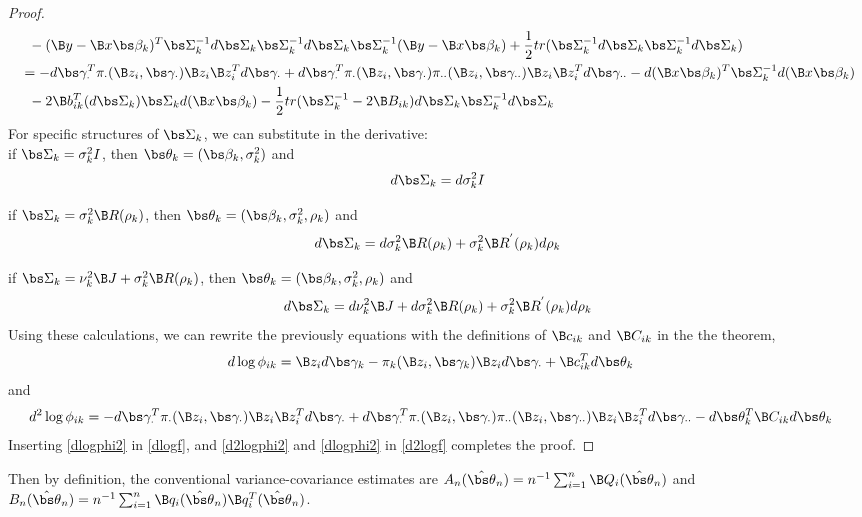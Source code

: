 \begin{proof}
\begin{align}
&\;\;-(\B y-\B x\bs \beta_{k})^{T}\bs\Sigma_{k}^{-1}d\bs\Sigma_{k}\bs\Sigma_{k}^{-1}d\bs\Sigma_{k}\bs\Sigma_{k}^{-1}(\B y-\B x\bs\beta_{k})+\frac{1}{2}tr(\bs\Sigma_{k}^{-1}d\bs\Sigma_{k}\bs\Sigma_{k}^{-1}d\bs\Sigma_{k})\nonumber\\
&=-d\bs\gamma_{\cdot}^{T}\pi_{\cdot}(\B z_{i},\bs\gamma_{\cdot})\B z_{i}\B z_{i}^{T}d\bs\gamma_{\cdot}+d\bs\gamma_{\cdot}^{T}\pi_{\cdot}(\B z_{i},\bs\gamma_{\cdot})\pi_{\cdot\cdot}(\B z_{i},\bs\gamma_{\cdot\cdot})\B z_{i}\B z_{i}^{T}d\bs\gamma_{\cdot\cdot}-d(\B x\bs \beta_{k})^{T}\bs\Sigma_{k}^{-1}d(\B x\bs \beta_{k})\nonumber\\
&\;\;-2\B b_{ik}^{T}(d\bs\Sigma_{k})\bs\Sigma_{k}d(\B x\bs\beta_{k})-\frac{1}{2}tr(\bs\Sigma_{k}^{-1}-2\B B_{ik})d\bs\Sigma_{k}\bs\Sigma_{k}^{-1}d\bs\Sigma_{k}\nonumber
\end{align}
For specific structures of $\bs\Sigma_{k}$, we can substitute in the derivative:\\

if $\bs\Sigma_{k}=\sigma_{k}^{2}I$, then $\bs\theta_{k}=(\bs\beta_{k},\sigma^{2}_{k})$ and
$$d\bs\Sigma_{k}=d\sigma_{k}^{2}I$$

if $\bs\Sigma_{k}=\sigma_{k}^{2}\B R(\rho_{k})$, then $\bs\theta_{k}=(\bs\beta_{k},\sigma^{2}_{k},\rho_{k})$ and
$$d\bs\Sigma_{k}=d\sigma_{k}^{2}\B R(\rho_{k}) +\sigma_{k}^{2}\B R^{'}(\rho_{k})d\rho_{k}$$

if $\bs\Sigma_{k}=\nu_{k}^{2}\B J+\sigma_{k}^{2}\B R(\rho_{k})$, then $\bs\theta_{k}=(\bs\beta_{k},\sigma^{2}_{k},\rho_{k})$ and
$$d\bs\Sigma_{k}=d\nu_{k}^{2}\B J + d\sigma_{k}^{2}\B R(\rho_{k}) +\sigma_{k}^{2}\B R^{'}(\rho_{k})d\rho_{k}$$
Using these calculations, we can rewrite the previously equations with the definitions of $\B c_{ik}$ and $\B C_{ik}$ in the the theorem,
\begin{align}\label{dlogphi2}
d\log \phi_{ik}&=\B z_{i} d\bs \gamma_{k} -\pi_{k}(\B z_{i},\bs\gamma_k)\B z_{i}d\bs\gamma_{\cdot}+\B c^{T}_{ik}d\bs\theta_{k} 
\end{align}
and
\begin{align}\label{d2logphi2}
d^{2}\log \phi_{ik}
&=-d\bs\gamma_{\cdot}^{T}\pi_{\cdot}(\B z_{i},\bs\gamma_{\cdot})\B z_{i}\B z_{i}^{T}d\bs\gamma_{\cdot}+d\bs\gamma_{\cdot}^{T}\pi_{\cdot}(\B z_{i},\bs\gamma_{\cdot})\pi_{\cdot\cdot}(\B z_{i},\bs\gamma_{\cdot\cdot})\B z_{i}\B z_{i}^{T}d\bs\gamma_{\cdot\cdot}-d\bs\theta_{k}^{T}\B C_{ik}d\bs\theta_{k}
\end{align}
Inserting \eqref{dlogphi2} in \eqref{dlogf}, and \eqref{d2logphi2} and \eqref{dlogphi2} in \eqref{d2logf} completes the proof.
\end{proof}
Then by definition, the conventional variance-covariance estimates are $A_{n}(\hat{\bs\theta}_{n})=n^{-1}\sum_{i=1}^{n}\B Q_{i}(\hat{\bs \theta}_{n})$ and $B_{n}(\hat{\bs\theta}_{n})=n^{-1}\sum_{i=1}^{n}\B q_{i}(\hat{\bs\theta}_{n})\B q_{i}^{T}(\hat{\bs\theta}_{n})$. 



